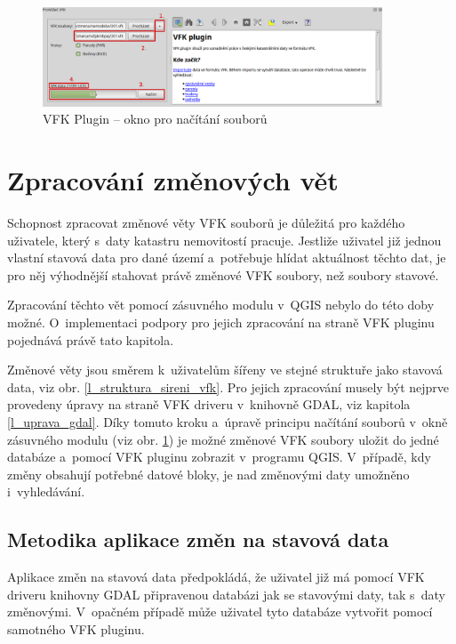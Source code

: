 \documentclass[a4paper,12pt,oneside]{book}
\begin{document}
\begin{figure}[htb]
\centering
\includegraphics[width=0.9\textwidth]{images/vfkPlugin-novy_vzhled.png}
\caption[VFK Plugin -- okno pro načítání souborů]{VFK Plugin -- okno pro načítání souborů}
\label{l_plugin_novy_vzhled}
\end{figure}


\section{Zpracování změnových vět}
\label{l_zpracovani_zmen}
Schopnost zpracovat změnové věty VFK souborů je důležitá pro
každého uživatele, který s~daty katastru nemovitostí pracuje. Jestliže
uživatel již jednou vlastní stavová data pro dané území a~potřebuje
hlídat aktuálnost těchto dat, je pro něj výhodnější stahovat právě
změnové VFK soubory, než soubory stavové.

Zpracování těchto vět pomocí zásuvného modulu v~QGIS nebylo do této
doby možné. O~implementaci podpory pro jejich zpracování na straně VFK
pluginu pojednává právě tato kapitola.

Změnové věty jsou směrem k~uživatelům šířeny ve stejné struktuře jako
stavová data, viz obr. \ref{l_struktura_sireni_vfk}. Pro jejich
zpracování musely být nejprve provedeny úpravy na straně VFK driveru
v~knihovně GDAL, viz kapitola \ref{l_uprava_gdal}. Díky tomuto kroku
a~úpravě principu načítání souborů v~okně zásuvného modulu (viz
obr. \ref{l_plugin_novy_vzhled}) je možné změnové VFK soubory uložit
do jedné databáze a~pomocí VFK pluginu zobrazit v~programu
QGIS. V~případě, kdy změny obsahují potřebné datové bloky, je nad
změnovými daty umožněno i~vyhledávání.

\subsection{Metodika aplikace změn na stavová data}

Aplikace změn na stavová data předpokládá, že uživatel již má pomocí
VFK driveru knihovny GDAL připravenou databázi jak se stavovými daty,
tak s~daty změnovými. V~opačném případě může uživatel tyto databáze
vytvořit pomocí samotného VFK pluginu.
\end{document}
